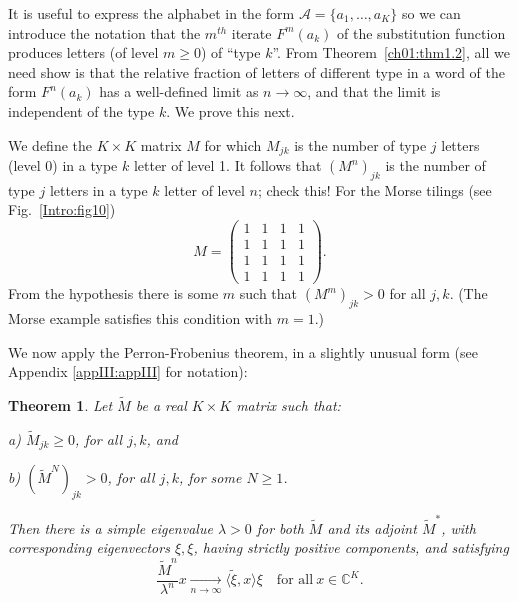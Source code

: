 \documentclass[reqno]{stml-l}
\theoremstyle{plain}
\newtheorem{theorem}{Theorem}[chapter]
\theoremstyle{definition}
\numberwithin{equation}{chapter}
\begin{document}
It is useful to express the alphabet in the form $\mathcal{A}=\{a_{1}, \ldots, a_{K}\}$ so we can introduce the notation that the $m^{th}$ iterate $F^{m}(a_{k})$ of the substitution function produces letters (of level $m\geq 0$) of ``type $k$''. From Theorem~\ref{ch01:thm1.2}, all we need show is that the relative fraction of letters of different type in a word of the form $F^{n}(a_{k})$ has a well-defined limit as $n\rightarrow\infty$, and that the limit is independent of the type $k$. We prove this next.

We define the $K\times K$ matrix $M$ for which $M_{jk}$ is the number of type $j$ letters (level $0$) in a type $k$ letter of level 1. It follows that
$(M^{n})_{jk}$ is the number of type $j$ letters in a type $k$ letter of level $n$; check this! For the Morse tilings (see Fig.~\ref{Intro:fig10})
\begin{equation}
M=\left(\begin{array}{llll}
1 & 1 & 1 & 1\\
1 & 1 & 1 & 1\\
1 & 1 & 1 & 1\\
1 & 1 & 1 & 1
\end{array}\right).\label{ch01:eqn1.15}
\end{equation}
From the hypothesis there is some $m$ such that $(M^{m})_{jk}>0$ for all $j,k$. (The Morse example satisfies this condition with $m=1$.)

We now apply the Perron-Frobenius theorem, in a slightly unusual form \cite[p. 136]{bib:Rue} (see Appendix \ref{appIII:appIII} for notation):


\begin{theorem}\label{ch01:thm1.6}
Let $\tilde{M}$ be a real $K\times K$ matrix such that:

a) $\tilde{M}_{jk}\geq 0$, for all $j,k$, and

b) $(\tilde{M}^{N})_{jk}>0$, for all $j,k$, for some $N\geq 1$.

\noindent Then there is a simple eigenvalue $\lambda>0$ for both $\tilde{M}$ and its adjoint $\tilde{M}^{\ast}$, with corresponding eigenvectors $\xi,\xi$, having strictly positive components, and satisfying
\begin{equation}
\frac{\tilde{M}^{n}}{\lambda^{n}}x \underset{n\rightarrow\infty}{\xrightarrow{\quad}}\langle\tilde{\xi}, x\rangle\xi\quad \text{for all}\ x\in \mathbb{C}^{K}.\label{ch01:eqn1.16}
\end{equation}
\end{theorem}
\end{document}
